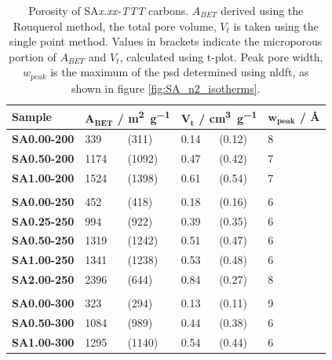\begin{table}[b!]
    \centering
    \caption{Porosity of SA\textit{x.xx-TTT} carbons. $A_{BET}$ derived using the Rouquerol method, the total pore volume, $V_t$ is taken using the single point method. Values in brackets indicate the microporous portion of $A_{BET}$ and $V_t$, calculated using t-plot. Peak pore width, $w_{peak}$ is the maximum of the \acrshort{psd} determined using \acrshort{nldft}, as shown in figure \ref{fig:SA_n2_isotherms}.}
    \label{tb:sa_porosity}
    \begin{tabularx}{0.9\textwidth}{lllllll}
    \toprule
        \textbf{Sample} & \multicolumn{2}{l}{$\mathbf{A_{BET}}$ \textbf{/ \unit[detect-weight]{\metre\squared\per\gram}}}  & \multicolumn{2}{l}{$\mathbf{V_t}$ \textbf{/ \unit[detect-weight]{\cm\cubed\per\gram}}} & \multicolumn{2}{l}{$\mathbf{w_{peak}}$ \textbf{/ \unit{\angstrom}}} \\
    \midrule
        \textbf{SA0.00-200} & 339 & (311) & 0.14 & (0.12) & 8 \\
        \textbf{SA0.50-200} & 1174 & (1092) & 0.47 & (0.42) & 7 \\
        \textbf{SA1.00-200} & 1524 & (1398) & 0.61 & (0.54) & 7 \\
        \\
        \textbf{SA0.00-250} & 452 & (418) & 0.18 & (0.16) & 6 \\
        \textbf{SA0.25-250} & 994 & (922) & 0.39 & (0.35) & 6 \\
        \textbf{SA0.50-250} & 1319 & (1242) & 0.51 & (0.47) & 6 \\
        \textbf{SA1.00-250} & 1341 & (1238) & 0.53 & (0.48) & 6 \\
        \textbf{SA2.00-250} & 2396 & (644) & 0.84 & (0.27) & 8 \\
        \\
        \textbf{SA0.00-300} & 323 & (294) & 0.13 & (0.11) & 9 \\
        \textbf{SA0.50-300} & 1084 & (989) & 0.44 & (0.38) & 6 \\
        \textbf{SA1.00-300} & 1295 & (1140) & 0.54 & (0.44) & 6 \\
    \bottomrule
    \end{tabularx}
\end{table}

